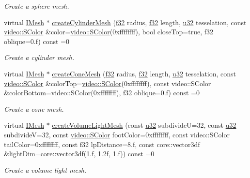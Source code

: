 \begin{DoxyCompactItemize}
\begin{DoxyCompactList}\small\item\em Create a sphere mesh. \end{DoxyCompactList}\item 
virtual \hyperlink{classirr_1_1scene_1_1IMesh}{I\+Mesh} $\ast$ \hyperlink{classirr_1_1scene_1_1IGeometryCreator_a87143de278ac305bc37dc905e800f5f8}{create\+Cylinder\+Mesh} (\hyperlink{namespaceirr_a0277be98d67dc26ff93b1a6a1d086b07}{f32} radius, \hyperlink{namespaceirr_a0277be98d67dc26ff93b1a6a1d086b07}{f32} length, \hyperlink{namespaceirr_a0416a53257075833e7002efd0a18e804}{u32} tesselation, const \hyperlink{classirr_1_1video_1_1SColor}{video\+::\+S\+Color} \&color=\hyperlink{classirr_1_1video_1_1SColor}{video\+::\+S\+Color}(0xffffffff), bool close\+Top=true, f32 oblique=0.\+f) const =0
\begin{DoxyCompactList}\small\item\em Create a cylinder mesh. \end{DoxyCompactList}\item 
virtual \hyperlink{classirr_1_1scene_1_1IMesh}{I\+Mesh} $\ast$ \hyperlink{classirr_1_1scene_1_1IGeometryCreator_af532c8fb5558cf274181eb81220db85b}{create\+Cone\+Mesh} (\hyperlink{namespaceirr_a0277be98d67dc26ff93b1a6a1d086b07}{f32} radius, \hyperlink{namespaceirr_a0277be98d67dc26ff93b1a6a1d086b07}{f32} length, \hyperlink{namespaceirr_a0416a53257075833e7002efd0a18e804}{u32} tesselation, const \hyperlink{classirr_1_1video_1_1SColor}{video\+::\+S\+Color} \&color\+Top=\hyperlink{classirr_1_1video_1_1SColor}{video\+::\+S\+Color}(0xffffffff), const video\+::\+S\+Color \&color\+Bottom=video\+::\+S\+Color(0xffffffff), f32 oblique=0.\+f) const =0
\begin{DoxyCompactList}\small\item\em Create a cone mesh. \end{DoxyCompactList}\item 
virtual \hyperlink{classirr_1_1scene_1_1IMesh}{I\+Mesh} $\ast$ \hyperlink{classirr_1_1scene_1_1IGeometryCreator_a4f4e4a3c266698c375d14c1e19a91407}{create\+Volume\+Light\+Mesh} (const \hyperlink{namespaceirr_a0416a53257075833e7002efd0a18e804}{u32} subdivideU=32, const \hyperlink{namespaceirr_a0416a53257075833e7002efd0a18e804}{u32} subdivideV=32, const \hyperlink{classirr_1_1video_1_1SColor}{video\+::\+S\+Color} foot\+Color=0xffffffff, const video\+::\+S\+Color tail\+Color=0xffffffff, const f32 lp\+Distance=8.\+f, const core\+::vector3df \&light\+Dim=core\+::vector3df(1.\+f, 1.\+2f, 1.\+f)) const =0
\begin{DoxyCompactList}\small\item\em Create a volume light mesh. \end{DoxyCompactList}\end{DoxyCompactItemize}
